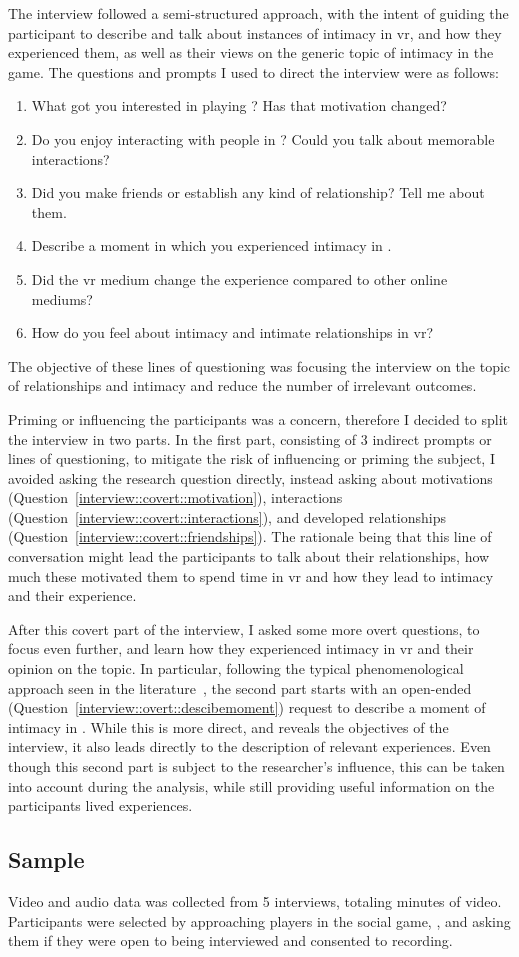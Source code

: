 The interview followed a semi-structured approach, with the intent of guiding the participant to describe and talk about instances of intimacy in \gls{vr}, and how they experienced them, as well as their views on the generic topic of intimacy in the game. The questions and prompts I used to direct the interview were as follows:
\begin{enumerate}
	\item\label{interview::covert::motivation} What got you interested in playing \vrc? Has that motivation changed?
	\item\label{interview::covert::interactions} Do you enjoy interacting with people in \vrc? Could you talk about memorable interactions? 
	\item\label{interview::covert::friendships} Did you make friends or establish any kind of relationship? Tell me about them.
	\item\label{interview::overt::descibemoment} Describe a moment in which you experienced intimacy in \vrc.
	\item\label{interview::overt::vrvsonline} Did the \gls{vr} medium change the experience compared to other online mediums? 
	\item\label{interview::overt::feelaboutintimacy} How do you feel about intimacy and intimate relationships in \gls{vr}?
\end{enumerate}

The objective of these lines of questioning was focusing the interview on the topic of relationships and intimacy and reduce the number of irrelevant outcomes.

Priming or influencing the participants was a concern, therefore I decided to split the interview in two parts.
In the first part, consisting of $3$ indirect prompts or lines of questioning, to mitigate the risk of influencing or priming the subject, I avoided asking the research question directly, instead asking about motivations (Question~\ref{interview::covert::motivation}), interactions (Question~\ref{interview::covert::interactions}), and developed relationships (Question~\ref{interview::covert::friendships}).
The rationale being that this line of conversation might lead the participants to talk about their relationships, how much these motivated them to spend time in \gls{vr} and how they lead to intimacy and their experience.

After this covert part of the interview, I asked some more overt questions, to focus even further, and learn how they experienced intimacy in \gls{vr} and their opinion on the topic.
In particular, following the typical phenomenological approach seen in the literature~\cite{register92}, the second part starts with an open-ended (Question~\ref{interview::overt::descibemoment}) request to describe a moment of intimacy in \vrc. 
While this is more direct, and reveals the objectives of the interview, it also leads directly to the description of relevant experiences.
Even though this second part is subject to the researcher's influence, this can be taken into account during the analysis, while still providing useful information on the participants lived experiences.


\subsection{Sample}
Video and audio data was collected from 5 interviews, totaling  minutes of video. 
Participants were selected by approaching players in the social game, \vrc, and asking them if they were open to being interviewed and consented to recording.